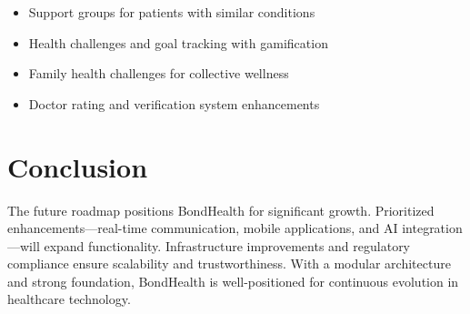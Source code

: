 \begin{itemize}
    \item Support groups for patients with similar conditions
    \item Health challenges and goal tracking with gamification
    \item Family health challenges for collective wellness
    \item Doctor rating and verification system enhancements
\end{itemize}

\section{Conclusion}

The future roadmap positions BondHealth for significant growth. Prioritized enhancements—real-time communication, mobile applications, and AI integration—will expand functionality. Infrastructure improvements and regulatory compliance ensure scalability and trustworthiness. With a modular architecture and strong foundation, BondHealth is well-positioned for continuous evolution in healthcare technology.
